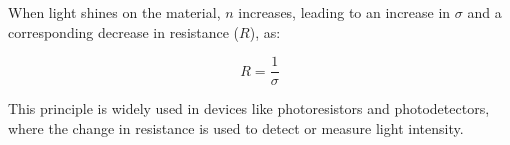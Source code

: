 When light shines on the material, \(n\) increases, leading to an increase in \(\sigma\) and a corresponding decrease in resistance (\(R\)), as:

\[
R = \frac{1}{\sigma}
\]

This principle is widely used in devices like photoresistors and photodetectors, where the change in resistance is used to detect or measure light intensity.

